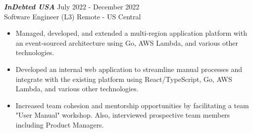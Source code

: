 {\sl \textbf{InDebted USA}} \hfill July 2022 - December 2022 \\ Software Engineer (L3) \hfill Remote - US Central
\begin{itemize}
    \item Managed, developed, and extended a multi-region application platform with an event-sourced architecture using Go, AWS Lambda, and various other technologies.
    \item Developed an internal web application to streamline manual processes and integrate with the existing platform using React/TypeScript, Go, AWS Lambda, and various other technologies.
    \item Increased team cohesion and mentorship opportunities by facilitating a team "User Manual" workshop. Also, interviewed prospective team members including Product Managers.
\end{itemize}
